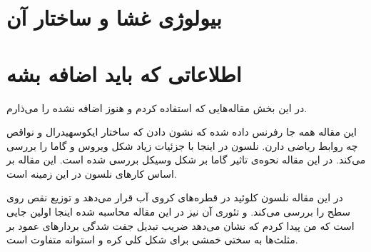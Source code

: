 \section{
بیولوژی غشا و ساختار آن
}

\section{
اطلاعاتی که باید اضافه بشه
}
در این بخش مقاله‌هایی  که استفاده کردم و هنوز اضافه نشده را می‌ذارم.

این مقاله همه جا رفرنس داده شده که نشون دادن که ساختار ایکوسهیدرال و نواقص چه روابط ریاضی دارن.
\cite{CasparKlug1962}
نلسون در اینجا با جزئیات زیاد شکل ویروس و گاما را بررسی می‌کند.
\cite{nelsonPRE2003}
در این مقاله نحوه‌ی تاثیر گاما بر شکل وسیکل بررسی شده است. این مقاله بر اساس کارهای نلسون در این زمینه‌ است.
\cite{gammaPRE2005}

در این مقاله نلسون کلوئید در قطره‌های کروی آب قرار می‌دهد و توزیع نقص روی سطح را بررسی می‌کند.
\cite{NelsonScience2003}
و  تئوری آن نیز در این مقاله‌ محاسبه ‌شده
\cite{NelsonPRB2000}
اینجا اولین جایی است که  من پیدا کردم که نشان می‌دهد ضریب تبدیل جفت شدگی بردارهای عمود بر مثلث‌ها به سختی خمشی برای  شکل  کلی کره و استوانه متفاوت است. 
\cite{GompperKroll1996}












